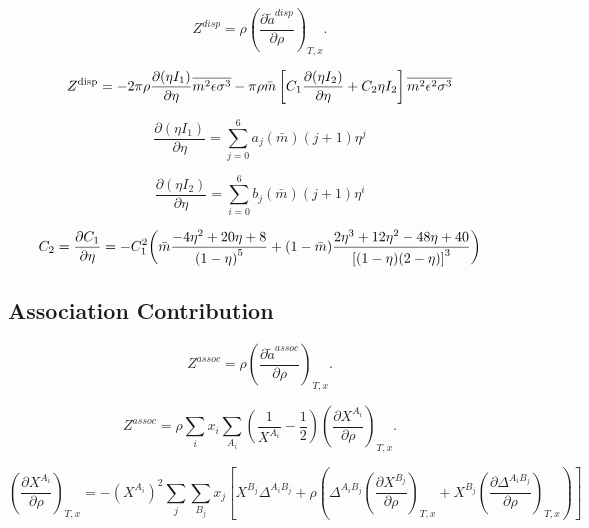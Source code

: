 \documentclass[12pt, letterpaper]{article}
\begin{document}
\cite{Gross2001}

\begin{equation}
Z^{disp} =\rho\left(\frac{\partial\tilde{a}^{disp}}{\partial\rho}\right)_{T,x}
.\end{equation}

\begin{equation}
Z^{\mathrm{disp}}=-2\pi\rho\frac{\partial(\eta I_{1})}{\partial\eta}\overline{m^{2}\epsilon\sigma^{3}}-\\\pi\rho\bar{m}\left[C_{1}\frac{\partial(\eta I_{2})}{\partial\eta}+C_{2}\eta I_{2}\right]\overline{m^{2}\epsilon^{2}\sigma^{3}}
\end{equation}

\begin{equation}
\frac{\partial(\eta I_1)}{\partial\eta}=\sum_{j=0}^6a_j(\bar{m})(j+1)\eta^j
\end{equation}

\begin{equation}
\frac{\partial(\eta I_2)}{\partial\eta}=\sum_{i=0}^6b_j(\bar{m})(j+1)\eta^i
\end{equation}

\begin{equation}
C_{2}=\frac{\partial C_{1}}{\partial\eta}=- C_{1}^{2}\biggl(\bar{m}\frac{-4\eta^{2}+20\eta+8}{\left(1-\eta\right)^{5}}+\\(1-\bar{m})\frac{2\eta^{3}+12\eta^{2}-48\eta+40}{\left[(1-\eta)(2-\eta)\right]^{3}}\biggr)
\end{equation}

\subsection{Association Contribution}

\cite{Chapman1990}

\begin{equation}
Z^{assoc} =\rho\left(\frac{\partial\tilde{a}^{assoc}}{\partial\rho}\right)_{T,x}
.\end{equation}

\begin{equation}
Z^{assoc}=\rho\sum_{i}x_{i}\sum_{A_{i}}\left(\frac{1}{X^{A_{i}}}-\frac{1}{2}\right)\left(\frac{\partial X^{A_{i}}}{\partial\rho}\right)_{T,x}.
\end{equation}

\begin{equation}
\left(\frac{\partial X^{A_{i}}}{\partial\rho}\right)_{T,x}=-(X^{A_{i}})^{2}\sum_{j}\sum_{B_{j}}x_{j}\left[X^{B_{j}}\Delta^{A_{i}B_{j}}+\rho\left(\Delta^{A_{i}B_{j}}\left(\frac{\partial X^{B_{j}}}{\partial\rho}\right)_{T,x}+X^{B_{j}}\left(\frac{\partial\Delta^{A_{i}B_{j}}}{\partial\rho}\right)_{T,x}\right)\right]
\end{equation}
\end{document}
